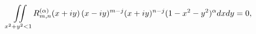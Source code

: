 \[\iint\limits_{x^{2}+y^{2}<1}\mathop{R^{(\alpha)}_{m,n}\/}\nolimits\!\left(x+iy%
\right)(x-iy)^{m-j}(x+iy)^{n-j}\*(1-x^{2}-y^{2})^{\alpha}dxdy=0,\]